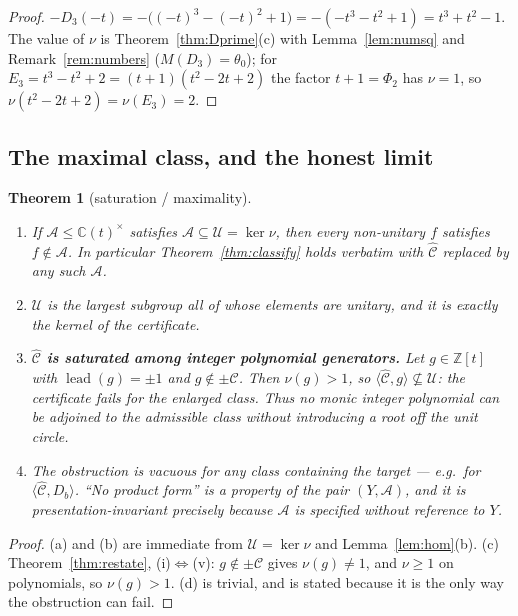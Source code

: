 \documentclass[11pt]{article}
\newtheorem{theorem}{Theorem}[section]
\theoremstyle{definition}
\DeclareMathOperator{\lead}{lead}
\newcommand{\ZZ}{\mathbb{Z}}
\newcommand{\CC}{\mathbb{C}}
\newcommand{\Chat}{\widehat{\mathcal{C}}}
\begin{document}
\begin{proof}
$-D_3(-t)=-\bigl((-t)^3-(-t)^2+1\bigr)=-(-t^{3}-t^{2}+1)=t^{3}+t^{2}-1$. The value of $\nu$ is
Theorem~\ref{thm:Dprime}(c) with Lemma~\ref{lem:numsq} and Remark~\ref{rem:numbers}
($M(D_3)=\theta_0$); for $E_3=t^3-t^2+2=(t+1)(t^2-2t+2)$ the factor $t+1=\Phi_2$ has $\nu=1$, so
$\nu(t^2-2t+2)=\nu(E_3)=2$.
\end{proof}

\subsection{The maximal class, and the honest limit}

\begin{theorem}[saturation / maximality]\label{thm:maximal}
\begin{enumerate}
\item[(a)] If $\mathcal{A}\le\CC(t)^\times$ satisfies $\mathcal{A}\subseteq\mathcal{U}=\ker\nu$,
then every non-unitary $f$ satisfies $f\notin\mathcal{A}$. In particular
Theorem~\ref{thm:classify} holds verbatim with $\Chat$ replaced by any such $\mathcal{A}$.
\item[(b)] $\mathcal{U}$ is the largest subgroup all of whose elements are unitary, and it is
exactly the kernel of the certificate.
\item[(c)] \textbf{$\Chat$ is saturated among integer polynomial generators.} Let $g\in\ZZ[t]$
with $\lead(g)=\pm1$ and $g\notin\pm\mathcal{C}$. Then $\nu(g)>1$, so
$\langle\Chat,g\rangle\not\subseteq\mathcal{U}$: the certificate fails for the enlarged class. Thus
no monic integer polynomial can be adjoined to the admissible class without introducing a root off
the unit circle.
\item[(d)] The obstruction is \emph{vacuous} for any class containing the target --- e.g.\ for
$\langle\Chat,D_b\rangle$. ``No product form'' is a property of the \emph{pair}
$(Y,\mathcal{A})$, and it is presentation-invariant precisely because $\mathcal{A}$ is specified
without reference to $Y$.
\end{enumerate}
\end{theorem}

\begin{proof}
(a) and (b) are immediate from $\mathcal{U}=\ker\nu$ and Lemma~\ref{lem:hom}(b).
(c) Theorem~\ref{thm:restate}, (i)$\Leftrightarrow$(v): $g\notin\pm\mathcal{C}$ gives
$\nu(g)\ne1$, and $\nu\ge1$ on polynomials, so $\nu(g)>1$. (d) is trivial, and is stated because
it is the only way the obstruction can fail.
\end{proof}
\end{document}
